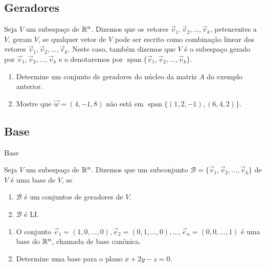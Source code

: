 \subsection*{Geradores}
\begin{frame}[label=lild]{}
\begin{defin}
Seja $V$ um subespaço de $\mathbb{R}^n$. Dizemos que os vetores $\vec{v}_1,\vec{v}_2,\ldots,\vec{v}_k$, petencentes a $V$, {\color{blue}geram} $V$, se qualquer vetor de $V$ pode ser escrito como combinação linear dos vetores $\vec{v}_1,\vec{v}_2,\ldots,\vec{v}_k$. Neste caso, também dizemos que $V$ é o {\color{blue}subespaço gerado por} $\vec{v}_1,\vec{v}_2,\ldots,\vec{v}_k$ e o denotaremos por $\operatorname{span}\{\vec{v}_1,\vec{v}_2,\ldots,\vec{v}_k\}$.
\end{defin}

\begin{exe}
\begin{enumerate}
\item Determine um conjunto de geradores do núcleo da matriz $A$ do exemplo anterior.

\item Mostre que $\vec{w}=(4,-1,8)$ não está em $\operatorname{span}\{(1,2,-1),(6,4,2)\}$.
\end{enumerate}
\end{exe}
%

\end{frame}

\subsection*{Base}
\begin{frame}[label=lild]{Base}
\begin{defin}
Seja $V$ um subespaço de $\mathbb{R}^n$. Dizemos que um subconjunto $\mathcal{B}=\{\vec{v}_1,\vec{v}_2,\ldots,\vec{v}_k\}$ de $V$ é uma {\color{blue}base} de $V$, se
\begin{enumerate}
\item $\mathcal{B}$ é um conjuntos de geradores de $V$.
\item $\mathcal{B}$ é LI.
\end{enumerate}
\end{defin}
\begin{exe}
\begin{enumerate}
\item O conjunto $\vec{e}_1=(1,0,\ldots,0), \vec{e}_2=(0,1,\ldots,0),\ldots, \vec{e}_n=(0,0,\ldots,1)$ é uma base do $\mathbb{R}^n$, chamada de {\color{blue}base canônica}.
\item Determine uma base para o plano $x+2y-z=0$.
\end{enumerate}

\end{exe}



\end{frame}

